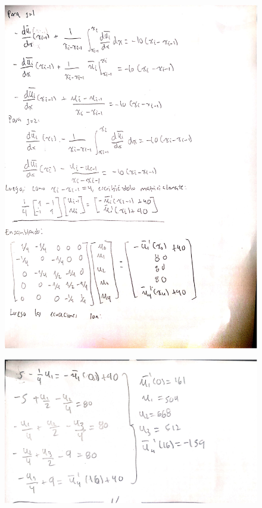 \documentclass[fleqn]{article}
\begin{document}
\begin{enumerate}
\begin{figure}[H]
        \end{figure}
        \begin{figure}[H]
          \centering \includegraphics[scale=.8]{figs/23}
        \end{figure}
        \begin{figure}[H]
          \centering \includegraphics[scale=.3]{figs/24}

\end{figure}
\end{enumerate}
\end{document}
